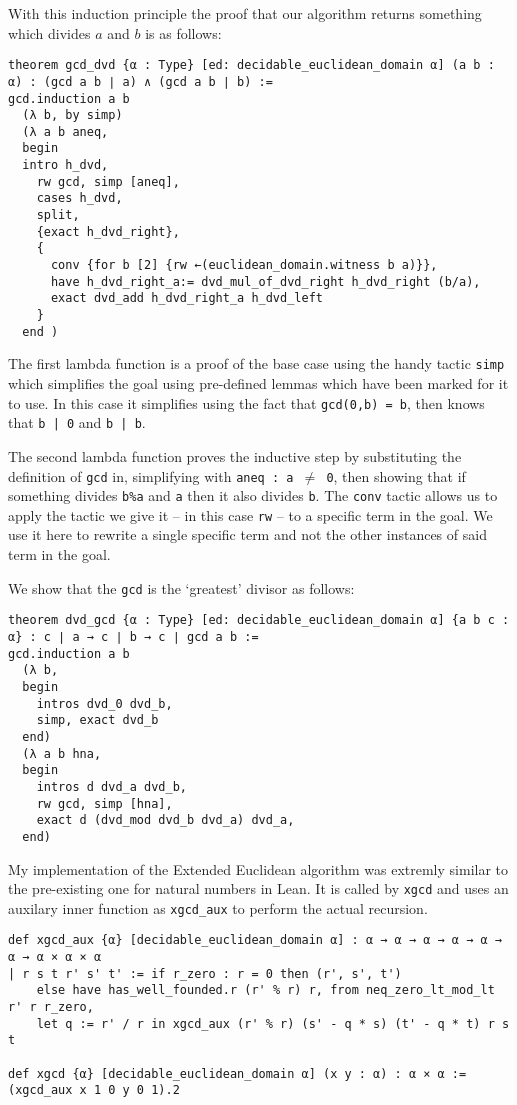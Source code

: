 \documentclass{article}
\newcommand{\ct}{\texttt}
\begin{document}
With this induction principle the proof that our algorithm returns something which divides $a$ and $b$ is as follows:
\begin{lstlisting}
theorem gcd_dvd {α : Type} [ed: decidable_euclidean_domain α] (a b : α) : (gcd a b ∣ a) ∧ (gcd a b ∣ b) :=
gcd.induction a b
  (λ b, by simp)
  (λ a b aneq,
  begin
  intro h_dvd,
    rw gcd, simp [aneq],
    cases h_dvd,
    split,
    {exact h_dvd_right},
    {
      conv {for b [2] {rw ←(euclidean_domain.witness b a)}},
      have h_dvd_right_a:= dvd_mul_of_dvd_right h_dvd_right (b/a),
      exact dvd_add h_dvd_right_a h_dvd_left
    }
  end )
\end{lstlisting}
The first lambda function is a proof of the base case using the handy tactic \ct{simp} which simplifies the goal using pre-defined lemmas which have been marked for it to use. 
In this case it simplifies using the fact that \ct{gcd(0,b) = b}, then knows that \ct{b | 0} and \ct{b | b}.

The second lambda function proves the inductive step by substituting the definition of \ct{gcd} in, simplifying with \ct{aneq : a $\neq$ 0}, then showing that if something divides \ct{b\%a} and \ct{a} then it also divides \ct{b}. The \ct{conv} tactic allows us to apply the tactic we give it -- in this case \ct{rw} -- to a specific term in the goal. We use it here to rewrite a single specific term and not the other instances of said term in the goal.

We show that the \ct{gcd} is the `greatest' divisor as follows:
\begin{lstlisting}
theorem dvd_gcd {α : Type} [ed: decidable_euclidean_domain α] {a b c : α} : c ∣ a → c ∣ b → c ∣ gcd a b :=
gcd.induction a b
  (λ b,
  begin
    intros dvd_0 dvd_b,
    simp, exact dvd_b
  end)
  (λ a b hna,
  begin
    intros d dvd_a dvd_b,
    rw gcd, simp [hna],
    exact d (dvd_mod dvd_b dvd_a) dvd_a,
  end)
\end{lstlisting}

My implementation of the Extended Euclidean algorithm was extremly similar to the pre-existing one for natural numbers in Lean. It is called by \ct{xgcd} and uses an auxilary inner function as \ct{xgcd\_aux} to perform the actual recursion.
\begin{lstlisting}
def xgcd_aux {α} [decidable_euclidean_domain α] : α → α → α → α → α → α → α × α × α
| r s t r' s' t' := if r_zero : r = 0 then (r', s', t') 
    else have has_well_founded.r (r' % r) r, from neq_zero_lt_mod_lt r' r r_zero,
    let q := r' / r in xgcd_aux (r' % r) (s' - q * s) (t' - q * t) r s t

def xgcd {α} [decidable_euclidean_domain α] (x y : α) : α × α := (xgcd_aux x 1 0 y 0 1).2
\end{lstlisting}
\end{document}
